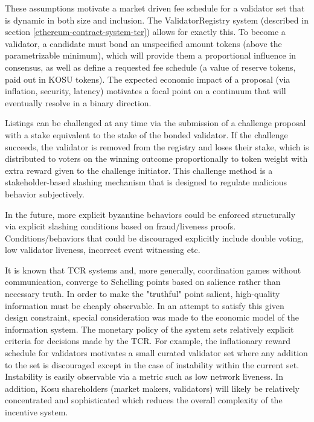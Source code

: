\documentclass[10pt]{article}
\begin{document}
These assumptions motivate a market driven fee schedule for a validator set that is dynamic in both size and inclusion. The ValidatorRegistry system (described in section \ref{ethereum-contract-system-tcr}) allows for exactly this. To become a validator, a candidate must bond an unspecified amount tokens (above the parametrizable minimum), which will provide them a proportional influence in consensus, as well as define a requested fee schedule (a value of reserve tokens, paid out in KOSU tokens). The expected economic impact of a proposal (via inflation, security, latency) motivates a focal point on a continuum that will eventually resolve in a binary direction. 
\medskip

Listings can be challenged at any time via the submission of a challenge proposal with a stake equivalent to the stake of the bonded validator. If the challenge succeeds, the validator is removed from the registry and loses their stake, which is distributed to voters on the winning outcome proportionally to token weight with extra reward given to the challenge initiator. This challenge method is a stakeholder-based slashing mechanism that is designed to regulate malicious behavior subjectively.
\medskip

In the future, more explicit byzantine behaviors could be enforced structurally via explicit slashing conditions based on fraud/liveness proofs. Conditions/behaviors that could be discouraged explicitly include double voting, low validator liveness, incorrect event witnessing etc.
\medskip

It is known that TCR systems and, more generally, coordination games without communication, converge to Schelling points based on salience rather than necessary truth\cite{tendermint-crypto-spec}. In order to make the "truthful" point salient, high-quality information must be cheaply observable. In an attempt to satisfy this given design constraint, special consideration was made to the economic model of the information system. The monetary policy of the system sets relatively explicit criteria for decisions made by the TCR. For example, the inflationary reward schedule for validators motivates a small curated validator set where any addition to the set is discouraged except in the case of instability within the current set. Instability is easily observable via a metric such as low network liveness. In addition, Kosu shareholders (market makers, validators) will likely be relatively concentrated and sophisticated which reduces the overall complexity of the incentive system.
\medskip
\end{document}
